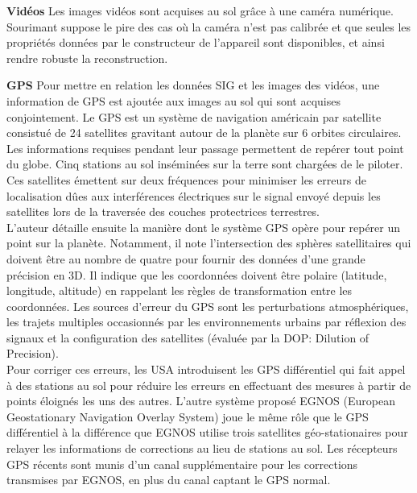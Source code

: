 \documentclass[11pt]{article}
\begin{document}
\textbf{Vidéos} Les images vidéos sont acquises au sol grâce à une caméra numérique. Sourimant suppose le pire des cas où la caméra n'est pas calibrée et que seules les propriétés données par le constructeur de l'appareil sont disponibles, et ainsi rendre robuste la reconstruction.

\textbf{GPS} Pour mettre en relation les données SIG et les images des vidéos, une information de GPS est ajoutée  aux images au sol qui sont acquises conjointement. Le GPS est un système de navigation américain par satellite consistué de 24 satellites gravitant autour de la planète sur 6 orbites circulaires. Les informations requises pendant leur passage permettent de repérer tout point du globe. Cinq stations au sol inséminées sur la terre sont chargées de le piloter. Ces satellites émettent sur deux fréquences pour minimiser les erreurs de localisation dûes aux interférences électriques sur le signal envoyé depuis les satellites lors de la traversée des couches protectrices terrestres. \\
L'auteur détaille ensuite la manière dont le système GPS opère pour repérer un point sur la planète. Notamment, il note l'intersection des sphères satellitaires qui doivent être au nombre de quatre pour fournir des données d'une grande précision en 3D. Il indique que les coordonnées doivent être polaire (latitude, longitude, altitude) en rappelant les règles de transformation entre les coordonnées. Les sources d'erreur du GPS sont les perturbations atmosphériques, les trajets multiples occasionnés par les environnements urbains par réflexion des signaux et la configuration des satellites (évaluée par la DOP: Dilution of Precision).\\
 Pour corriger ces erreurs, les USA introduisent les GPS différentiel qui fait appel à des stations au sol pour réduire les erreurs en effectuant des mesures à partir de points éloignés les uns des autres. L'autre système proposé EGNOS (European Geostationary Navigation Overlay System) joue le même rôle que le GPS différentiel à la différence que EGNOS utilise trois satellites géo-stationaires pour relayer les informations de corrections au lieu de stations au sol. Les récepteurs GPS récents sont munis d'un canal supplémentaire pour les corrections transmises par EGNOS, en plus du canal captant le GPS normal.
\end{document}
